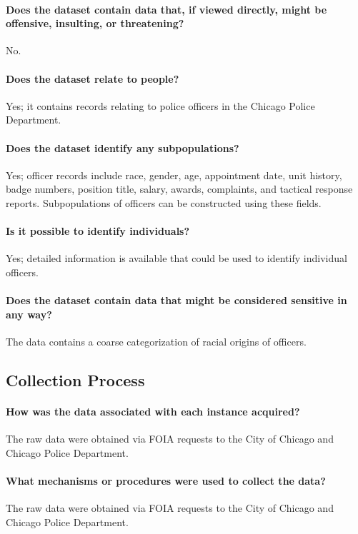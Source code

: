 \paragraph{Does the dataset contain data that, if viewed directly, might be offensive, insulting, or threatening?}
No.

\paragraph{Does the dataset relate to people?} 
Yes; it contains records relating to police officers in the Chicago Police Department.

\paragraph{Does the dataset identify any subpopulations?}
Yes; officer records include race, gender, age, appointment date, unit history, badge numbers, position title,
salary, awards, complaints, and tactical response reports. Subpopulations of officers can be constructed
using these fields.

\paragraph{Is it possible to identify individuals?}
Yes; detailed information is available that could be used to identify individual officers.

\paragraph{Does the dataset contain data that might be considered sensitive in any way?}
The data contains a coarse categorization of racial origins of officers.

\subsection{Collection Process}

\paragraph{How was the data associated with each instance acquired?}
The raw data were obtained via FOIA requests to the City of Chicago and Chicago Police Department.

\paragraph{What mechanisms or procedures were used to collect the data?}
The raw data were obtained via FOIA requests to the City of Chicago and Chicago Police Department.

